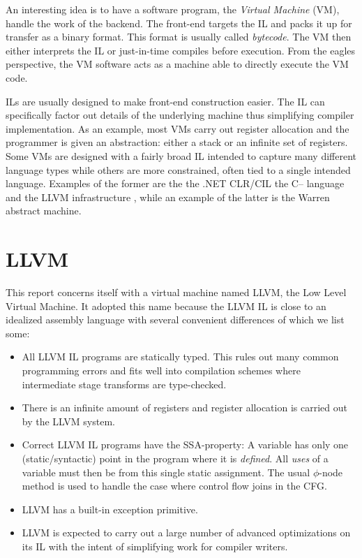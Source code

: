\documentclass[a4paper, oneside, 10pt, draft]{memoir}
\begin{document}
An interesting idea is to have a software program, the \emph{Virtual
  Machine} (VM), handle the work of the backend. The front-end
targets the IL and packs it up for transfer as a binary format. This
format is usually called \emph{bytecode}. The VM then either
interprets the IL or just-in-time compiles before execution. From the
eagles perspective, the VM software acts as a machine able to directly
execute the VM code.

ILs are usually designed to make front-end construction easier. The IL
can specifically factor out details of the underlying machine thus
simplifying compiler implementation. As an example, most VMs carry out
register allocation and the programmer is given an abstraction: either
a stack or an infinite set of registers. Some VMs are designed with a
fairly broad IL intended to capture many different language types
while others are more constrained, often tied to a single intended
language. Examples of the former are the the .NET
CLR/CIL\cite{ecma:2006:335} the C-- language\cite{http:cminmin} and
the LLVM infrastructure \cite{lattner.ea:2009:llvm-ref}, while an
example of the latter is the Warren abstract
machine\cite{warren:1983:prolog}.

\section{LLVM}

This report concerns itself with a virtual machine named LLVM, the Low
Level Virtual Machine. It adopted this name because the LLVM IL is
close to an idealized assembly language with several convenient
differences of which we list some:
\begin{itemize}
\item All LLVM IL programs are statically typed. This rules out many
  common programming errors and fits well into compilation schemes
  where intermediate stage transforms are type-checked.
\item There is an infinite amount of registers and register allocation
  is carried out by the LLVM system.
\item Correct LLVM IL programs have the SSA-property: A variable has
  only one (static/syntactic) point in the program where it is
  \emph{defined}. All \emph{uses} of a variable must then be from this
  single static assignment. The usual $\phi$-node method is used to
  handle the case where control flow joins in the CFG.
\item LLVM has a built-in exception primitive.
\item LLVM is expected to carry out a large number of advanced
  optimizations on its IL with the intent of simplifying work for
  compiler writers.
\end{itemize}
\end{document}
